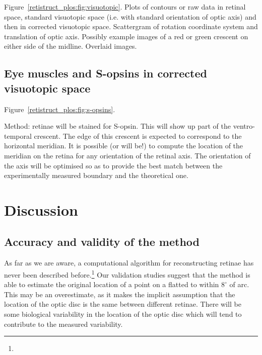 \documentclass[10pt]{article}
\begin{document}
Figure~\ref{retistruct_plos:fig:visuotopic}. Plots of contours or raw
data in retinal space, standard visuotopic space (i.e. with standard
orientation of optic axis) and then in corrected visuotopic
space. Scattergram of rotation coordinate system and translation of
optic axis. Possibly example images of a red or green crescent on
either side of the midline. Overlaid images.






\subsection*{Eye muscles and S-opsins in corrected visuotopic space}
\label{retistruct_plos:sec:appl-estim-direct}

Figure~\ref{retistruct_plos:fig:s-opsins}.

Method: retinae will be stained for S-opsin. This will show up part
of the ventro-temporal crescent. The edge of this crescent is expected
to correspond to the horizontal meridian. It is possible (or will
be!) to compute the location of the meridian on the retina for any
orientation of the retinal axis.  The orientation of the axis will be
optimised so as to provide the best match between the experimentally
measured boundary and the theoretical one.


\section*{Discussion}

\subsection*{Accuracy and validity of the method}

As far as we are aware, a computational algorithm for reconstructing
retinae has never been described
before.\footnote{} Our validation
studies suggest that the method is able to estimate the original
location of a point on a flatted to within $8^\circ$ of arc. This may
be an overestimate, as it makes the implicit assumption that the
location of the optic disc is the same between different retinae.
There will be some biological variability in the location of the
optic disc which will tend to contribute to the measured variability.
\end{document}
